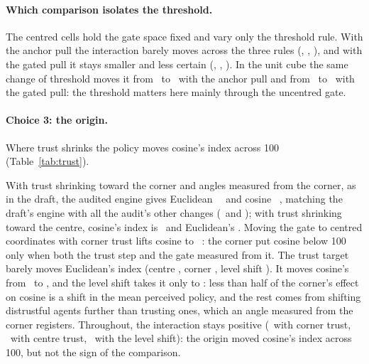 \documentclass[11pt]{article}
\begin{document}
\paragraph{Which comparison isolates the threshold.}
The centred cells hold the gate space fixed and vary only the threshold rule.
With the anchor pull the interaction barely moves across the three rules (\VFCentredRawAnchorInter, \VFCentredMatchedAnchorInter, \VFCentredRunAnchorInter), and with the gated pull it stays smaller and less certain (\VFCentredRawGatedInter, \VFCentredMatchedGatedInter, \VFCentredRunGatedInter).
In the unit cube the same change of threshold moves it from \VFUnitRawAnchorInter\ to \VFUnitRunAnchorInter\ with the anchor pull and from \VFUnitRawGatedInter\ to \VFUnitRunGatedInter\ with the gated pull: the threshold matters here mainly through the uncentred gate.

\paragraph{Choice 3: the origin.}
Where trust shrinks the policy moves cosine's index across 100 (Table~\ref{tab:trust}).

\begin{table}[t]
\centering\small
\caption{Trust targets with the draft's shared threshold and gated pull: lag index (lag 0 $=100$, relative shock effect, 95\% CI) per geometry, lag-0 relative shock effect (Euclidean / cosine), and the paired interaction; $^{=}$ marks equivalence to zero. Level shift: centre shrinkage plus the same shift, $-(1-\bar\tau)$, for every agent. The unit-gate status quo and own-opinion rows come from the target sweep.}
\label{tab:trust}

\end{table}
With trust shrinking toward the corner and angles measured from the corner, as in the draft, the audited engine gives Euclidean \VTUnitRawCornerEucIdx\ \VTUnitRawCornerEucIdxCI\ and cosine \VTUnitRawCornerCosIdx\ \VTUnitRawCornerCosIdxCI, matching the draft's engine with all the audit's other changes (\VCDraftFixedEucIdx\ and \VCDraftFixedCosIdx); with trust shrinking toward the centre, cosine's index is \VTUnitRawCentreCosIdx\ and Euclidean's \VTUnitRawCentreEucIdx.
Moving the gate to centred coordinates with corner trust lifts cosine to \VTCentredRawCornerCosIdx\ \VTCentredRawCornerCosIdxCI: the corner put cosine below 100 only when both the trust step and the gate measured from it.
The trust target barely moves Euclidean's index (centre \VTUnitRawCentreEucIdx, corner \VTUnitRawCornerEucIdx, level shift \VTUnitRawLevelShiftEucIdx).
It moves cosine's from \VTUnitRawCentreCosIdx\ to \VTUnitRawCornerCosIdx, and the level shift takes it only to \VTUnitRawLevelShiftCosIdx: less than half of the corner's effect on cosine is a shift in the mean perceived policy, and the rest comes from shifting distrustful agents further than trusting ones, which an angle measured from the corner registers.
Throughout, the interaction stays positive (\VTUnitRawCornerInter\ with corner trust, \VTUnitRawCentreInter\ with centre trust, \VTUnitRawLevelShiftInter\ with the level shift): the origin moved cosine's index across 100, but not the sign of the comparison.
\end{document}
